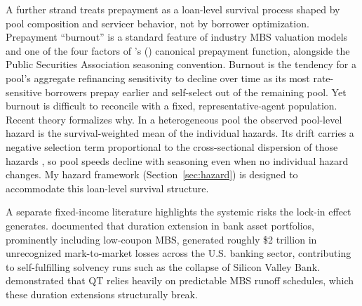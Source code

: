 \documentclass[12pt]{article}
\newcommand{\citepos}[1]{\citeauthor{#1}'s (\citeyear{#1})}
\begin{document}
A further strand treats prepayment as a loan-level survival process shaped by pool composition and servicer behavior, not by borrower optimization. Prepayment ``burnout'' is a standard feature of industry MBS valuation models and one of the four factors of \citepos{richard1989} canonical prepayment function, alongside the Public Securities Association seasoning convention. Burnout is the tendency for a pool's aggregate refinancing sensitivity to decline over time as its most rate-sensitive borrowers prepay earlier and self-select out of the remaining pool. Yet burnout is difficult to reconcile with a fixed, representative-agent population. Recent theory formalizes why. In a heterogeneous pool the observed pool-level hazard is the survival-weighted mean of the individual hazards. Its drift carries a negative selection term proportional to the cross-sectional dispersion of those hazards \citep[arXiv preprint]{lesniewski2026}, so pool speeds decline with seasoning even when no individual hazard changes. My hazard framework (Section~\ref{sec:hazard}) is designed to accommodate this loan-level survival structure.

A separate fixed-income literature highlights the systemic risks the lock-in effect generates. \citet{jiang2023} documented that duration extension in bank asset portfolios, prominently including low-coupon MBS, generated roughly \$2 trillion in unrecognized mark-to-market losses across the U.S. banking sector, contributing to self-fulfilling solvency runs such as the collapse of Silicon Valley Bank. \citet{smith2023} demonstrated that QT relies heavily on predictable MBS runoff schedules, which these duration extensions structurally break.
\end{document}
